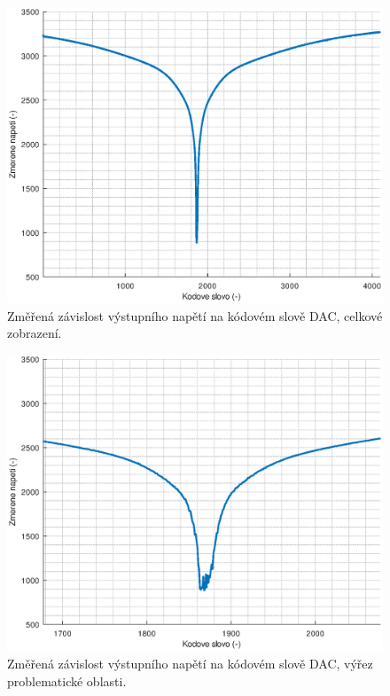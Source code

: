 \begin{figure}[htbp]
\includegraphics[width=\textwidth,keepaspectratio]{images/log_function_graph_whole.eps}\caption{Změřená závislost výstupního napětí na kódovém slově DAC, celkové zobrazení.}\label{log_function_graph_whole}
\end{figure}

\begin{figure}[htbp]
\includegraphics[width=\textwidth,keepaspectratio]{images/log_function_graph_zoomed.eps}\caption{Změřená závislost výstupního napětí na kódovém slově DAC, výřez problematické oblasti.}\label{log_function_graph_zoomed}
\end{figure}

